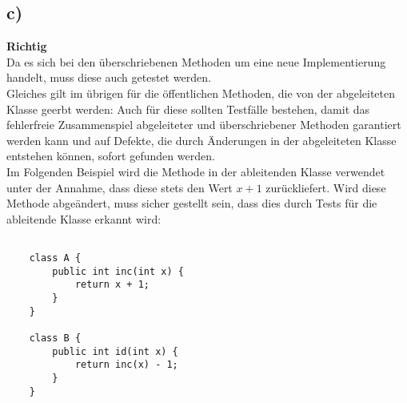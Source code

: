 \subsection*{c)}



\textbf{Richtig}\\
Da es sich bei den überschriebenen Methoden um eine neue Implementierung handelt, muss diese auch getestet werden.\\

\noindent
Gleiches gilt im übrigen für die öffentlichen Methoden, die von der abgeleiteten Klasse geerbt werden: Auch für diese sollten Testfälle bestehen, damit das fehlerfreie Zusammenspiel abgeleiteter und überschriebener Methoden garantiert werden kann und auf Defekte, die durch Änderungen in der abgeleiteten Klasse entstehen können, sofort gefunden werden.\\
Im Folgenden Beispiel wird die Methode  in der ableitenden Klasse verwendet unter der Annahme, dass diese stets den Wert $x + 1$ zurückliefert.
Wird diese Methode abgeändert, muss sicher gestellt sein, dass dies durch Tests für die ableitende Klasse erkannt wird:

\begin{verbatim}

    class A {
        public int inc(int x) {
            return x + 1;
        }
    }

    class B {
        public int id(int x) {
            return inc(x) - 1;
        }
    }
\end{verbatim}
